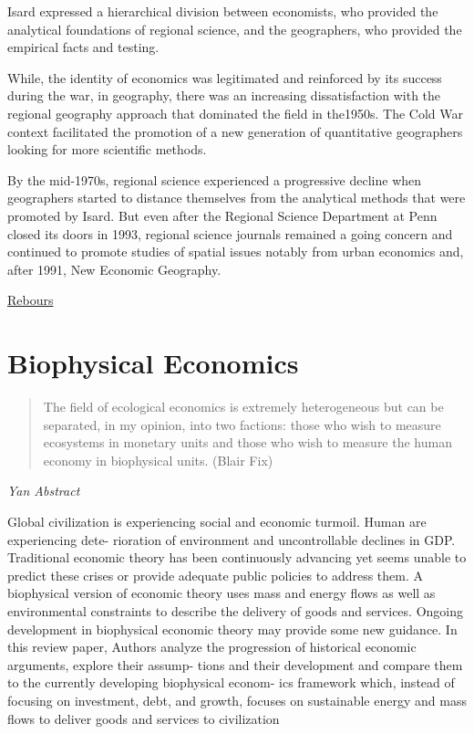 \documentclass[
]{book}
\begin{document}
Isard expressed a hierarchical division between economists, who provided
the analytical foundations of regional science,
and the geographers, who provided the empirical facts and testing.

While, the identity of economics was legitimated and reinforced by its success during the war, in geography, there was an increasing dissatisfaction with the regional geography approach that dominated the field in the1950s. The Cold War context facilitated the promotion of a new generation of quantitative geographers looking for more scientific methods.

By the mid-1970s, regional science experienced a progressive decline when geographers started to distance themselves from the analytical methods that were promoted by Isard. But even after the Regional Science Department at Penn closed its doors in 1993, regional science journals remained a going concern and continued to promote studies of spatial issues notably from urban economics and, after 1991, New Economic Geography.

\href{https://hscif.org/economists-in-the-city-rebours/}{Rebours}

\hypertarget{biophysical-economics}{%
\chapter{Biophysical Economics}\label{biophysical-economics}}

\begin{quote}
The field of ecological economics is extremely heterogeneous but can be separated, in my
opinion, into two factions: those who wish to measure ecosystems in monetary units and those who wish to measure the human economy in biophysical units. (Blair Fix)
\end{quote}

\emph{Yan Abstract}

Global civilization is experiencing social and economic turmoil. Human are experiencing dete-
rioration of environment and uncontrollable declines in GDP. Traditional economic theory has
been continuously advancing yet seems unable to predict these crises or provide adequate public
policies to address them. A biophysical version of economic theory uses mass and energy flows as
well as environmental constraints to describe the delivery of goods and services. Ongoing
development in biophysical economic theory may provide some new guidance. In this review
paper, Authors analyze the progression of historical economic arguments, explore their assump-
tions and their development and compare them to the currently developing biophysical econom-
ics framework which, instead of focusing on investment, debt, and growth, focuses on sustainable
energy and mass flows to deliver goods and services to civilization
\end{document}
